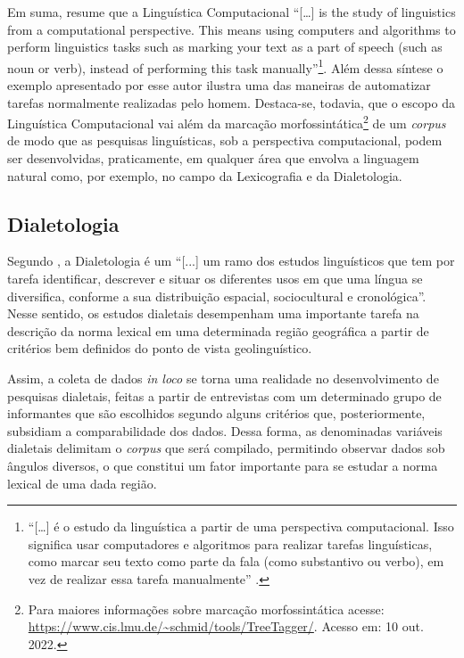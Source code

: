 \documentclass[portuguese]{textolivre}
\begin{document}
Em suma, \textcite[p. 11, tradução nossa]{srinivasa2018natural} resume que a Linguística Computacional “[…] is the study of linguistics from a computational perspective. This means using computers and algorithms to perform linguistics tasks such as marking your text as a part of speech (such as noun or verb), instead of performing this task manually”\footnote{“[…] é o estudo da linguística a partir de uma perspectiva computacional. Isso significa usar computadores e algoritmos para realizar tarefas linguísticas, como marcar seu texto como parte da fala (como substantivo ou verbo), em vez de realizar essa tarefa manualmente” \cite[p. 11]{srinivasa2018natural}.}. Além dessa síntese o exemplo apresentado por esse autor ilustra uma das maneiras de automatizar tarefas normalmente realizadas pelo homem. Destaca-se, todavia, que o escopo da Linguística Computacional vai além da marcação morfossintática\footnote{Para maiores informações sobre marcação morfossintática acesse: \url{https://www.cis.lmu.de/~schmid/tools/TreeTagger/}. Acesso em: 10 out. 2022.} de um \emph{corpus} de modo que as pesquisas linguísticas, sob a perspectiva computacional, podem ser desenvolvidas, praticamente, em qualquer área que envolva a linguagem natural como, por exemplo, no campo da Lexicografia e da Dialetologia.

\subsection{Dialetologia}

Segundo \textcite[p. 15]{cardoso2010}, a Dialetologia é um “[...] um ramo dos estudos linguísticos que tem por tarefa identificar, descrever e situar os diferentes usos em que uma língua se diversifica, conforme a sua distribuição espacial, sociocultural e cronológica”. Nesse sentido, os estudos dialetais desempenham uma importante tarefa na descrição da norma lexical em uma determinada região geográfica a partir de critérios bem definidos do ponto de vista geolinguístico.

Assim, a coleta de dados \emph{in loco} se torna uma realidade no desenvolvimento de pesquisas dialetais, feitas a partir de entrevistas com um determinado grupo de informantes que são escolhidos segundo alguns critérios que, posteriormente, subsidiam a comparabilidade dos dados. Dessa forma, as denominadas variáveis dialetais delimitam o \emph{corpus} que será compilado, permitindo observar dados sob ângulos diversos, o que constitui um fator importante para se estudar a norma lexical de uma dada região.
\end{document}
